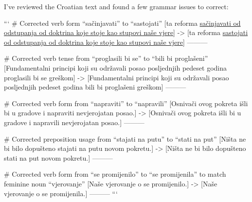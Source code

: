 I've reviewed the Croatian text and found a few grammar issues to correct:

```
# Corrected verb form “sačinjavati” to “sastojati”
[ta reforma \underline{sačinjavati od odstupanja od doktrina koje stoje kao stupovi naše vjere}]
->
[ta reforma \underline{sastojati od odstupanja od doktrina koje stoje kao stupovi naše vjere}]
---------

# Corrected verb tense from “proglasili bi se” to “bili bi proglašeni”
[Fundamentalni principi koji su održavali posao posljednjih pedeset godina proglasili bi se greškom]
->
[Fundamentalni principi koji su održavali posao posljednjih pedeset godina bili bi proglašeni greškom]
---------

# Corrected verb form from “napraviti” to “napravili”
[Osnivači ovog pokreta išli bi u gradove i napraviti nevjerojatan posao.]
->
[Osnivači ovog pokreta išli bi u gradove i napravili nevjerojatan posao.]
---------

# Corrected preposition usage from “stajati na putu” to “stati na put”
[Ništa ne bi bilo dopušteno stajati na putu novom pokretu.]
->
[Ništa ne bi bilo dopušteno stati na put novom pokretu.]
---------

# Corrected verb form from “se promijenilo” to “se promijenila” to match feminine noun “vjerovanje”
[Naše vjerovanje o  se promijenilo.]
->
[Naše vjerovanje o  se promijenila.]
---------
```